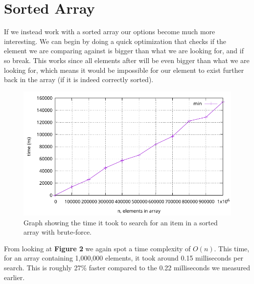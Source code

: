 \documentclass[a4paper, 11pt]{article}
\begin{document}
\section{Sorted Array}
	If we instead work with a sorted array our options become much more interesting.
	We can begin by doing a quick optimization that checks if the element we are comparing against is bigger than what we are looking for, and if so break.
	This works since all elements after will be even bigger than what we are looking for,
	which means it would be impossible for our element to exist further back in the array (if it is indeed correctly sorted).
	\begin{figure}[H]
		\centering
		\includegraphics[scale=0.8]{graphs/plot_brute_sorted.pdf}
		\caption{
			Graph showing the time it took to search for an item in a sorted array with brute-force.
		}
	\end{figure}
	\par
	From looking at \textbf{Figure 2} we again spot a time complexity of \(O(n)\).
	This time, for an array containing 1,000,000 elements, it took around 0.15 milliseconds per search.
	This is roughly 27\% faster compared to the 0.22 milliseconds we measured earlier.
\end{document}
